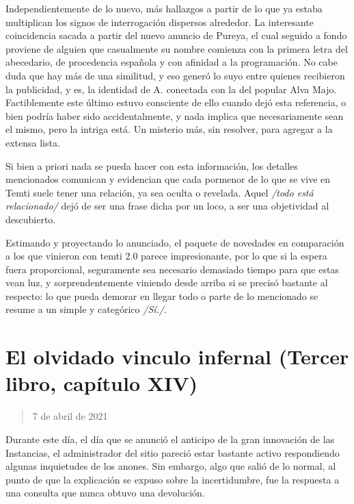\documentclass[
]{book}
\begin{document}
Independientemente de lo nuevo, más hallazgos a partir de lo que ya estaba multiplican los signos de interrogación dispersos alrededor. La interesante coincidencia sacada a partir del nuevo anuncio de Pureya, el cual seguido a fondo proviene de alguien que casualmente su nombre comienza con la primera letra del abecedario, de procedencia española y con afinidad a la programación. No cabe duda que hay más de una similitud, y eso generó lo suyo entre quienes recibieron la publicidad, y es, la identidad de A. conectada con la del popular Alva Majo. Factiblemente este último estuvo consciente de ello cuando dejó esta referencia, o bien podría haber sido accidentalmente, y nada implica que necesariamente sean el mismo, pero la intriga está. Un misterio más, sin resolver, para agregar a la extensa lista.

Si bien a priori nada se pueda hacer con esta información, los detalles mencionados comunican y evidencian que cada pormenor de lo que se vive en Temti suele tener una relación, ya sea oculta o revelada. Aquel \emph{/todo está relacionado/} dejó de ser una frase dicha por un loco, a ser una objetividad al descubierto.

Estimando y proyectando lo anunciado, el paquete de novedades en comparación a los que vinieron con temti 2.0 parece impresionante, por lo que si la espera fuera proporcional, seguramente sea necesario demasiado tiempo para que estas vean luz, y sorprendentemente viniendo desde arriba si se precisó bastante al respecto: lo que pueda demorar en llegar todo o parte de lo mencionado se resume a un simple y categórico \emph{/Sí./}.

\hypertarget{el-olvidado-vinculo-infernal-tercer-libro-capuxedtulo-xiv}{%
\section{El olvidado vinculo infernal (Tercer libro, capítulo XIV)}\label{el-olvidado-vinculo-infernal-tercer-libro-capuxedtulo-xiv}}

\begin{quote}
7 de abril de 2021
\end{quote}

Durante este día, el día que se anunció el anticipo de la gran innovación de las Instancias, el administrador del sitio pareció estar bastante activo respondiendo algunas inquietudes de los anones. Sin embargo, algo que salió de lo normal, al punto de que la explicación se expuso sobre la incertidumbre, fue la respuesta a una consulta que nunca obtuvo una devolución.
\end{document}
